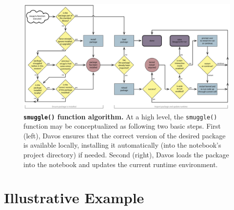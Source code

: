 \documentclass[preprint,12pt,a4paper]{elsarticle}
\begin{document}
\begin{figure}[tp]
\centering
\includegraphics[width=\textwidth]{figs/flow_chart}
\caption{\small \textbf{\texttt{smuggle()} function algorithm.}  At a
  high level, the \texttt{smuggle()} function may be conceptualized as
  following two basic steps.  First (left), Davos ensures that the
  correct version of the desired package is available locally, installing
  it automatically (into the notebook's project directory) if needed.  Second (right),
  Davos loads the package into the notebook and updates the current
  runtime environment.}
\label{fig:flow-chart}
\end{figure}

\section{Illustrative Example}\label{sec:illustrative-example}
\end{document}
